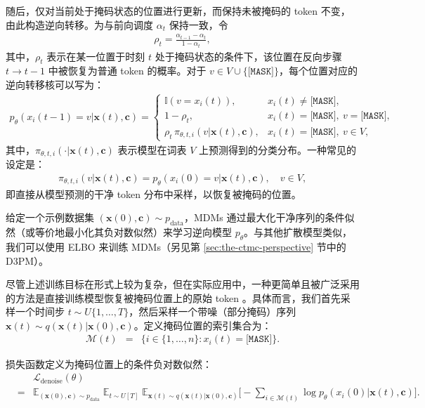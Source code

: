 \noindent 随后，仅对当前处于掩码状态的位置进行更新，而保持未被掩码的 token 不变，由此构造逆向转移。为与前向调度 $\alpha_t$ 保持一致，令
\begin{eqnarray}
\rho_t=\frac{\alpha_{t-1}-\alpha_t}{1-\alpha_t},
\label{eq:mdm-unmask-probability}
\end{eqnarray}
其中，$\rho_t$ 表示在某一位置于时刻 $t$ 处于掩码状态的条件下，该位置在反向步骤 $t\to t-1$ 中被恢复为普通 token 的概率。对于 $v\in V\cup\{\texttt{[MASK]}\}$，每个位置对应的逆向转移核可以写为：
\begin{eqnarray}
p_\theta(x_i(t-1)=v| \mathbf{x}(t), \mathbf{c})
=
\begin{cases}
\mathbb{I}\!\left(v=x_i(t)\right), & x_i(t) \neq \texttt{[MASK]},\\
1-\rho_t, & x_i(t)=\texttt{[MASK]},\ v=\texttt{[MASK]},\\
\rho_t\,\pi_{\theta,t,i}\!\left(v | \mathbf{x}(t), \mathbf{c}\right),
& x_i(t)=\texttt{[MASK]},\ v\in V,
\end{cases}
\label{eq:mdm-reverse-keep-or-sample}
\end{eqnarray}
其中，$\pi_{\theta,t,i}(\cdot | \mathbf{x}(t),\mathbf{c})$ 表示模型在词表 $V$ 上预测得到的分类分布。一种常见的设定是：
\begin{eqnarray}
\pi_{\theta,t,i}\!\left(v | \mathbf{x}(t),\mathbf{c}\right)=p_\theta\!\left(x_i(0)=v | \mathbf{x}(t),\mathbf{c}\right), \quad v\in V,
\label{eq:mdm-pi-as-denoise}
\end{eqnarray}
即直接从模型预测的干净 token 分布中采样，以恢复被掩码的位置。

给定一个示例数据集 $(\mathbf{x}(0),\mathbf{c})\sim p_{\text{data}}$，MDMs 通过最大化干净序列的条件似然（或等价地最小化其负对数似然）来学习逆向模型 $p_\theta$。与其他扩散模型类似，我们可以使用 ELBO 来训练 MDMs（另见第 \ref{sec:the-ctmc-perspective} 节中的 D3PM）。

尽管上述训练目标在形式上较为复杂，但在实际应用中，一种更简单且被广泛采用的方法是直接训练模型恢复被掩码位置上的原始 token 。具体而言，我们首先采样一个时间步 $t\sim U\{1,\dots,T\}$，然后采样一个带噪（部分掩码）序列 $\mathbf{x}(t)\sim q(\mathbf{x}(t)| \mathbf{x}(0),\mathbf{c})$。定义掩码位置的索引集合为：
\begin{eqnarray}
\mathcal{M}(t) & = & \{i\in\{1,\dots,n\} : x_i(t)=\texttt{[MASK]}\}.
\end{eqnarray}

\noindent 损失函数定义为掩码位置上的条件负对数似然：
\begin{eqnarray}
& & \mathcal{L}_{\text{denoise}}(\theta) \nonumber \\
&=&
\mathbb{E}_{(\mathbf{x}(0),\mathbf{c})\sim p_{\text{data}}}
\;
\mathbb{E}_{t\sim U[T]}
\;
\mathbb{E}_{\mathbf{x}(t)\sim q(\mathbf{x}(t)| \mathbf{x}(0),\mathbf{c})}
\Bigg[
-\sum_{i\in \mathcal{M}(t)} \log p_\theta\!\left(x_i(0)| \mathbf{x}(t),\mathbf{c}\right)
\Bigg].
\label{eq:mdm-denoise-ce}
\end{eqnarray}

